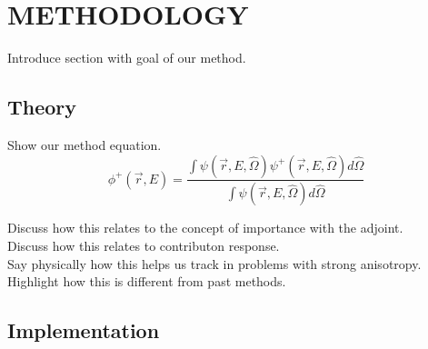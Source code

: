 \documentclass[12pt]{article}
\begin{document}
%
\section{METHODOLOGY}
\label{sect::methodology}

Introduce section with goal of our method. \\

%
\subsection{Theory}
\label{subsect::theory}

Show our method equation. \\


\begin{equation} 
\label{eq:angularhybrid}
\phi^{+}(\vec{r},E) = \frac{\int \psi(\vec {r} ,E,\hat{\Omega})\psi^+(\vec {r} ,E,\hat{\Omega})d\hat\Omega }{\int\psi(\vec {r} ,E,\hat{\Omega})d\hat\Omega}
\end{equation}


Discuss how this relates to the concept of importance with the adjoint. \\
Discuss how this relates to contributon response. \\
Say physically how this helps us track in problems with strong anisotropy. \\
Highlight how this is different from past methods.

%

\subsection{Implementation}
\label{subsect::implementation}
\end{document}
